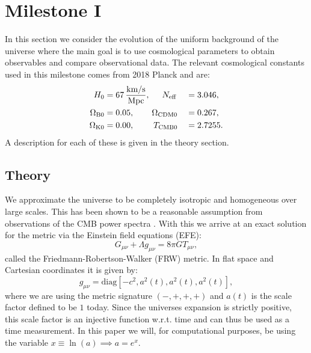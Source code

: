 \documentclass[%
reprint,
 amsmath,amssymb,
 aps,
]{revtex4-2}
\begin{document}
\section{Milestone I}

In this section we consider the evolution of the uniform background of the universe where the main goal is to use cosmological parameters to obtain observables and compare observational data. The relevant cosmological constants used in this milestone comes from 2018 Planck \cite{Planck:2018vyg} and are:
\begin{alignat*}{2}
	H_0 &= 67\,\frac{\text{km/s}}{\text{Mpc}},\hspace{5mm}N_\text{eff}&&=3.046,\\
	\Omega_{\text B0}&=0.05,\hspace{7.3mm}\Omega_{\text{CDM}0}&&=0.267,\\
	\Omega_{\text K0}&=0.00,\hspace{8mm}T_{\text{CMB}0}&&=2.7255.
\end{alignat*}
A description for each of these is given in the theory section.

\subsection{Theory}
We approximate the universe to be completely isotropic and homogeneous over large scales. This has been shown to be a reasonable assumption from observations of the CMB power spectra \cite{dodelson:2003ft}. With this we arrive at an exact solution for the metric via the Einstein field equations (EFE):
\begin{equation}
	G_{\mu\nu}+\Lambda g_{\mu\nu}=8\pi G T_{\mu\nu},\label{EFE}
\end{equation}
called the Friedmann-Robertson-Walker (FRW) metric. In flat space and Cartesian coordinates it is given by:
\[g_{\mu\nu}=\text{diag}[-c^2,a^2(t),a^2(t),a^2(t)],\]
where we are using the metric signature $(-,+,+,+)$ and $a(t)$ is the scale factor defined to be $1$ today. Since the universes expansion is strictly positive, this scale factor is an injective function w.r.t. time and can thus be used as a time measurement. In this paper we will, for computational purposes, be using the variable $x\equiv\ln(a)\implies a=e^x$. 
\end{document}
